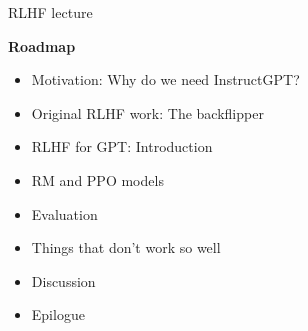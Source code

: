 \begin{vbframe}{RLHF lecture}

\vfill

\textbf{Roadmap}

	\begin{itemize}
		\item Motivation: Why do we need InstructGPT?
		\item Original RLHF work: The backflipper
                \item RLHF for GPT: Introduction 
                  \item RM and PPO models
                  \item Evaluation
                    \item Things that don't work so well
\item Discussion
\item Epilogue
	\end{itemize}

\vfill

\end{vbframe}
